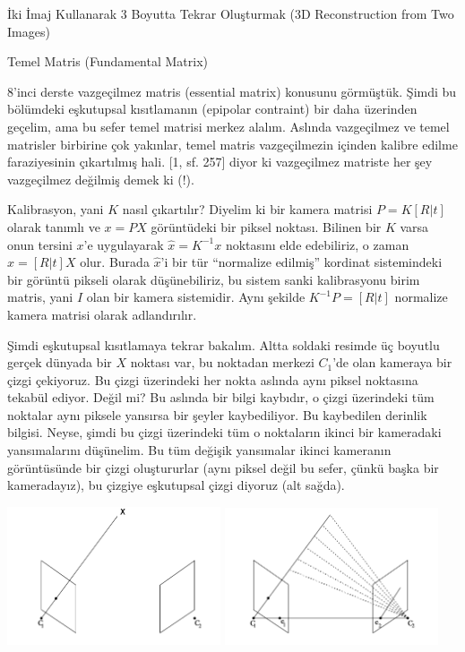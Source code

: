 \documentclass[12pt,fleqn]{article}\usepackage{../../common}
\begin{document}
İki İmaj Kullanarak 3 Boyutta Tekrar Oluşturmak (3D Reconstruction from Two Images)

Temel Matris (Fundamental Matrix)

8'inci derste vazgeçilmez matris (essential matrix) konusunu görmüştük. Şimdi bu
bölümdeki eşkutupsal kısıtlamanın (epipolar contraint) bir daha üzerinden
geçelim, ama bu sefer temel matrisi merkez alalım. Aslında vazgeçilmez ve temel
matrisler birbirine çok yakınlar, temel matris vazgeçilmezin içinden kalibre
edilme faraziyesinin çıkartılmış hali. [1, sf. 257] diyor ki vazgeçilmez
matriste her şey vazgeçilmez değilmiş demek ki (!).

Kalibrasyon, yani $K$ nasıl çıkartılır? Diyelim ki bir kamera matrisi
$P = K[R | t]$ olarak tanımlı ve $x = PX$ görüntüdeki bir piksel
noktası. Bilinen bir $K$ varsa onun tersini $x$'e uygulayarak
$\hat{x} = K ^{-1}x$ noktasını elde edebiliriz, o zaman
$\hat{x} = [R | t]X$ olur. Burada $\hat{x}$'i bir tür ``normalize edilmiş''
kordinat sistemindeki bir görüntü pikseli olarak düşünebiliriz, bu sistem
sanki kalibrasyonu birim matris, yani $I$ olan bir kamera sistemidir. Aynı
şekilde $K ^{-1} P = [R|t]$ normalize kamera matrisi olarak adlandırılır.

Şimdi eşkutupsal kısıtlamaya tekrar bakalım. Altta soldaki resimde üç
boyutlu gerçek dünyada bir $X$ noktası var, bu noktadan merkezi $C_1$'de
olan kameraya bir çizgi çekiyoruz. Bu çizgi üzerindeki her nokta aslında
aynı piksel noktasına tekabül ediyor. Değil mi? Bu aslında bir bilgi
kaybıdır, o çizgi üzerindeki tüm noktalar aynı piksele yansırsa bir şeyler
kaybediliyor. Bu kaybedilen derinlik bilgisi. Neyse, şimdi bu çizgi
üzerindeki tüm o noktaların ikinci bir kameradaki yansımalarını
düşünelim. Bu tüm değişik yansımalar ikinci kameranın görüntüsünde bir
çizgi oluştururlar (aynı piksel değil bu sefer, çünkü başka bir
kameradayız), bu çizgiye eşkutupsal çizgi diyoruz (alt sağda).

\includegraphics[width=17em]{vision_20recons_04.png}
\includegraphics[width=17em]{vision_20recons_05.png}
\end{document}
